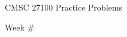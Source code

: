 \documentclass[12pt]{article}
\begin{document}
\hfill CMSC 27100 Practice Problems

\hfill Week \#
\end{document}
